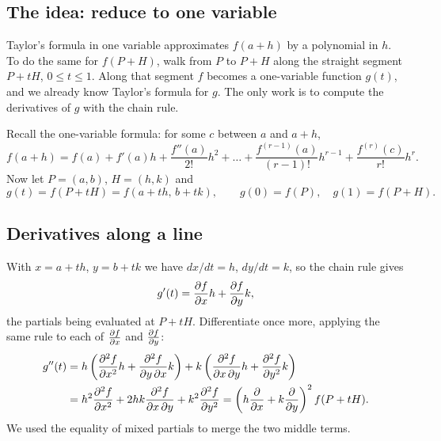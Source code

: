 \subsection{The idea: reduce to one variable}

\begin{intuition}
Taylor's formula in one variable approximates $f(a+h)$ by a polynomial in $h$. To do the same
for $f(P+H)$, walk from $P$ to $P+H$ along the straight segment $P+tH$, $0\le t\le1$. Along
that segment $f$ becomes a one-variable function $g(t)$, and we already know Taylor's formula
for $g$. The only work is to compute the derivatives of $g$ with the chain rule.
\end{intuition}

Recall the one-variable formula: for some $c$ between $a$ and $a+h$,
\[
f(a+h)=f(a)+f'(a)h+\frac{f''(a)}{2!}h^2+\dots+\frac{f^{(r-1)}(a)}{(r-1)!}h^{r-1}+\frac{f^{(r)}(c)}{r!}h^r .
\]
Now let $P=(a,b)$, $H=(h,k)$ and
\[ g(t)=f(P+tH)=f(a+th,\,b+tk), \qquad g(0)=f(P),\quad g(1)=f(P+H). \]

\begin{center}
\end{center}

\subsection{Derivatives along a line}

With $x=a+th$, $y=b+tk$ we have $dx/dt=h$, $dy/dt=k$, so the chain rule gives
\[ g'(t)=\frac{\partial f}{\partial x} h+\frac{\partial f}{\partial y} k, \]
the partials being evaluated at $P+tH$. Differentiate once more, applying the same rule to
each of $\frac{\partial f}{\partial x}$ and $\frac{\partial f}{\partial y}$:
\begin{align*}
g''(t)&=h\left(\frac{\partial^2 f}{\partial x^2} h+\frac{\partial^2 f}{\partial y\,\partial x} k\right)+k\left(\frac{\partial^2 f}{\partial x\,\partial y} h+\frac{\partial^2 f}{\partial y^2} k\right)\\
&=h^2\frac{\partial^2 f}{\partial x^2}+2hk\frac{\partial^2 f}{\partial x\,\partial y}+k^2\frac{\partial^2 f}{\partial y^2}=\left(h\frac{\partial }{\partial x}+k\frac{\partial }{\partial y}\right)^2f(P+tH).
\end{align*}
We used the equality of mixed partials to merge the two middle terms.

